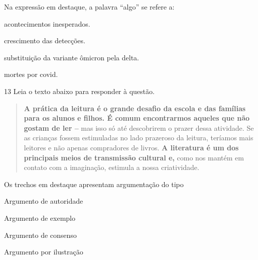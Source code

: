 
Na expressão em destaque, a palavra ``algo'' se refere a:

\begin{escolha}
  
  \item acontecimentos inesperados.
  
  \item crescimento das detecções.
  
  \item substituição da variante ômicron pela delta.
  
  \item mortes por covid.

\end{escolha}

\pagebreak

\num{13} Leia o texto abaixo para responder à questão. 

\begin{quote}

\textbf{A prática da leitura é o grande desafio da escola e das famílias
para os alunos e filhos. É comum encontrarmos aqueles que não gostam de
ler --} mas isso só até descobrirem o prazer dessa atividade. Se as
crianças fossem estimuladas no lado prazeroso da leitura, teríamos mais
leitores e não apenas compradores de livros. \textbf{A literatura é um
dos principais meios de transmissão cultural e,} como nos mantém em
contato com a imaginação, estimula a nossa criatividade.

\end{quote}


Os trechos em destaque apresentam argumentação do tipo

\begin{escolha}

    \item Argumento de autoridade

    \item Argumento de exemplo

    \item Argumento de consenso

    \item Argumento por ilustração

\end{escolha}


